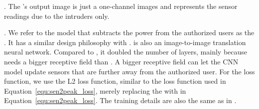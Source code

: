 . 
The \subtract's output image is just a one-channel images and represents the sensor readings due to the intruders only.  

.
We refer to the model that subtracts the power from the authorized users as the \subtract. 
It has a similar design philosophy with \imgimg.
\subtract is also an image-to-image translation neural network.
Compared to \imgimg, it doubled the number of layers, mainly because \subtract needs a bigger receptive field than \imgimg.
A bigger receptive field can let the CNN model update sensors that are further away from the authorized user.
For the loss function, we use the L2 loss function, similar to the loss function used in Equation~\ref{equ:sen2peak_loss}, merely replacing the \imgimg with \subtract in Equation~\ref{equ:sen2peak_loss}.
The training details are also the same as in \imgimg.
